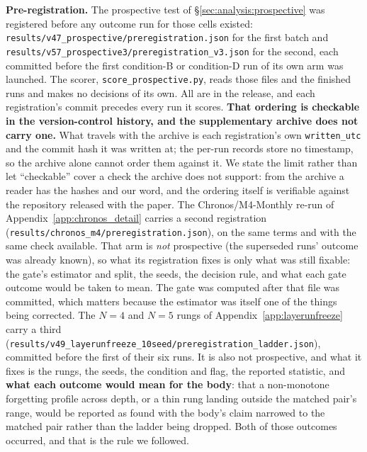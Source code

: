 \textbf{Pre-registration.}  The prospective test of
\S\ref{sec:analysis:prospective} was registered before any outcome run for
those cells existed: \texttt{results/v47\_prospective/preregistration.json} for
the first batch and \texttt{results/v57\_prospective3/preregistration\_v3.json}
for the second, each committed before the first condition-B or condition-D run
of its own arm was launched.  The scorer,
\texttt{score\_prospective.py}, reads those files and the finished runs and makes
no decisions of its own.  All are in the release, and each registration's commit
precedes every run it scores.  \textbf{That ordering is checkable in the
version-control history, and the supplementary archive does not carry one.}  What
travels with the archive is each registration's own \texttt{written\_utc} and the
commit hash it was written at; the per-run records store no timestamp, so the
archive alone cannot order them against it.  We state the limit rather than let
``checkable'' cover a check the archive does not support: from the archive a
reader has the hashes and our word, and the ordering itself is verifiable against
the repository released with the paper.  The Chronos/M4-Monthly re-run of
Appendix~\ref{app:chronos_detail} carries a second registration
(\texttt{results/chronos\_m4/preregistration.json}), on the same terms and with
the same check available.  That arm is \emph{not} prospective (the superseded
runs' outcome was already known), so what its registration fixes is only what
was still fixable: the gate's estimator and split, the seeds, the decision rule,
and what each gate outcome would be taken to mean.  The gate was computed after
that file was committed, which matters because the estimator was itself one of
the things being corrected.
The $N{=}4$ and $N{=}5$ rungs of Appendix~\ref{app:layerunfreeze} carry a third
(\texttt{results/v49\_layerunfreeze\_10seed/preregistration\_ladder.json}),
committed before the first of their six runs.  It is also not prospective, and
what it fixes is the rungs, the seeds, the condition and flag, the reported
statistic, and \textbf{what each outcome would mean for the body}: that a
non-monotone forgetting profile across depth, or a thin rung landing outside the
matched pair's range, would be reported as found with the body's claim narrowed to
the matched pair rather than the ladder being dropped.  Both of those outcomes
occurred, and that is the rule we followed.

